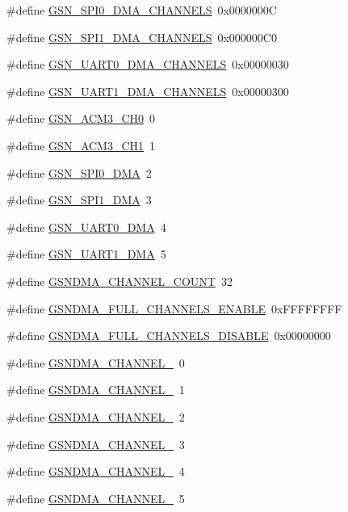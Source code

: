 \begin{DoxyCompactItemize}
\item 
\#define \hyperlink{a00484_a518ed5af9857de8db4ce3248328e9c6b}{GSN\_\-SPI0\_\-DMA\_\-CHANNELS}~0x0000000C
\item 
\#define \hyperlink{a00484_a145e8d83b4aab58ed8c87c5fba134412}{GSN\_\-SPI1\_\-DMA\_\-CHANNELS}~0x000000C0
\item 
\#define \hyperlink{a00484_afcbc9006c931ac89b672bae0b187f309}{GSN\_\-UART0\_\-DMA\_\-CHANNELS}~0x00000030
\item 
\#define \hyperlink{a00484_a49bae6c89e0e2813bc051b25e1961d6e}{GSN\_\-UART1\_\-DMA\_\-CHANNELS}~0x00000300
\item 
\#define \hyperlink{a00484_a645b22e6469e278bf6deccf1488f6edb}{GSN\_\-ACM3\_\-CH0}~0
\item 
\#define \hyperlink{a00484_ad60b99042fe6931090ef916ad0f64e35}{GSN\_\-ACM3\_\-CH1}~1
\item 
\#define \hyperlink{a00484_a90eb18824f9b1b14a6e642364c002099}{GSN\_\-SPI0\_\-DMA}~2
\item 
\#define \hyperlink{a00484_adb83f42ccdcff7832a0f4717a7b8c0f7}{GSN\_\-SPI1\_\-DMA}~3
\item 
\#define \hyperlink{a00484_a0aec9c64944acaf248ad1dd7cee8c937}{GSN\_\-UART0\_\-DMA}~4
\item 
\#define \hyperlink{a00484_a94eeeed32bfd2b1263bd50406eaa1b25}{GSN\_\-UART1\_\-DMA}~5
\item 
\#define \hyperlink{a00484_a05c6a73586179b2bc758895613204d0c}{GSNDMA\_\-CHANNEL\_\-COUNT}~32
\item 
\#define \hyperlink{a00484_acb90501fb017d4fdd51aab3c5591a555}{GSNDMA\_\-FULL\_\-CHANNELS\_\-ENABLE}~0xFFFFFFFF
\item 
\#define \hyperlink{a00484_a7294ea06db1a491f659cf220e1b51c0b}{GSNDMA\_\-FULL\_\-CHANNELS\_\-DISABLE}~0x00000000
\item 
\#define \hyperlink{a00484_a71f8e6c80cdbf3c086ef3e31be6c9168}{GSNDMA\_\-CHANNEL\_}~0
\item 
\#define \hyperlink{a00484_aafc0246b2f3e95feffb5213a48966346}{GSNDMA\_\-CHANNEL\_}~1
\item 
\#define \hyperlink{a00484_a5deead63a92314854b45c055598c043c}{GSNDMA\_\-CHANNEL\_}~2
\item 
\#define \hyperlink{a00484_a9dfd424f980f9c35bcc55e66916d8605}{GSNDMA\_\-CHANNEL\_}~3
\item 
\#define \hyperlink{a00484_a62f3ee88b0075bbb2d86216cf011a601}{GSNDMA\_\-CHANNEL\_}~4
\item 
\#define \hyperlink{a00484_a3fdf644bda1e436a4d3278ad1b69efe0}{GSNDMA\_\-CHANNEL\_}~5

\end{DoxyCompactItemize}
